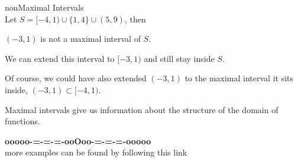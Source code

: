 \documentclass{ximera}
\begin{document}
\begin{example} nonMaximal Intervals \\
Let $S = [-4, 1) \cup \{ 1, 4 \} \cup (5, 9)$, then


$(-3, 1)$ is not a maximal interval of $S$.

We can extend this interval to $[-3, 1)$ and still stay inside $S$.


\end{example}
Of course, we could have also extended $(-3, 1)$ to the maximal interval it sits inside, $(-3, 1) \subset [-4, 1)$. 

Maximal intervals give us information about the structure of the domain of functions.

















\begin{center}
\textbf{\textcolor{green!50!black}{ooooo-=-=-=-ooOoo-=-=-=-ooooo}} \\

more examples can be found by following this link\\ 

\end{center}
\end{document}
